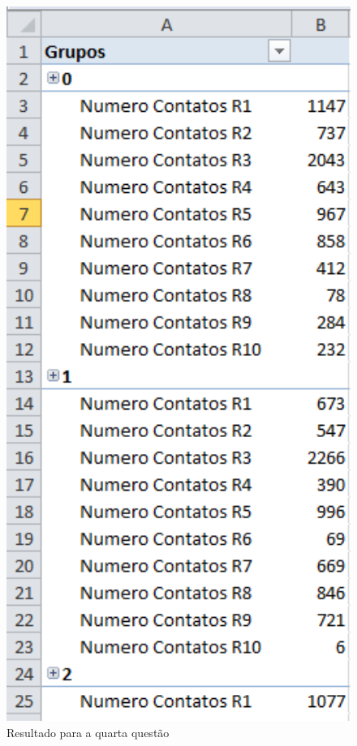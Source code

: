 \begin{figure}[h]
        \center
        \includegraphics[width=14cm]{images/Questao4.PNG}
        \caption{Resultado para a quarta questão}
        \label{fig:questao4}


\end{figure}
